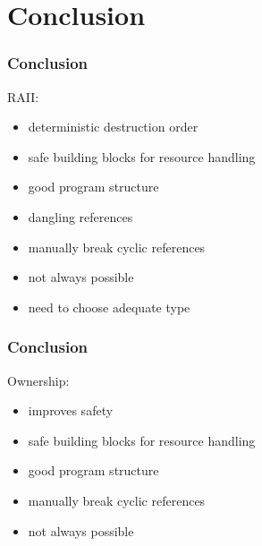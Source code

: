 \documentclass[xcolor=colortbl
]{beamer}
\begin{document}
\section{Conclusion}


\begin{frame}
    \frametitle{Conclusion}
    RAII:
    \begin{itemize}
        \item deterministic destruction order
        \item safe building blocks for resource handling
        \item good program structure
        \item dangling references
        \item manually break cyclic references
        \item not always possible
        \item need to choose adequate type
    \end{itemize}
\end{frame}

\begin{frame}
    \frametitle{Conclusion}
    Ownership:
    \begin{itemize}
        \item improves safety
        \item safe building blocks for resource handling
        \item good program structure
        \item manually break cyclic references
        \item not always possible
    \end{itemize}
\end{frame}
\end{document}
